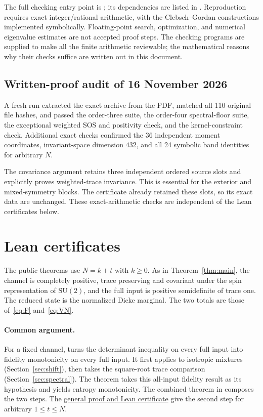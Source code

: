 \documentclass[11pt,a4paper]{article}
\begin{document}
The full checking entry point is ; its dependencies
are listed in . Reproduction requires exact
integer/rational arithmetic, with the Clebsch--Gordan constructions
implemented symbolically. Floating-point search, optimization, and
numerical eigenvalue estimates are not accepted proof steps. The
checking programs are supplied to make all the finite arithmetic
reviewable; the mathematical reasons why their checks suffice are
written out in this document.

\subsection{Written-proof audit of 16 November 2026}
A fresh run extracted the exact archive from the PDF, matched all 110
original file hashes, and passed the order-three suite, the order-four
spectral-floor suite, the exceptional weighted SOS and positivity check,
and the kernel-constraint check. Additional exact checks confirmed the
36 independent moment coordinates, invariant-space dimension $432$, and
all 24 symbolic band identities for arbitrary $N$.

The covariance argument retains three independent ordered
source slots and explicitly proves weighted-trace invariance. This is
essential for the exterior and mixed-symmetry blocks. The certificate
already retained these slots, so its exact data are unchanged.
These exact-arithmetic checks are independent of the Lean certificates below.

\clearpage\section{Lean certificates}\label{sec:lean}
The public theorems use $N=k+t$ with $k\ge0$. As in
Theorem~\ref{thm:main}, the channel is completely positive,
trace preserving and covariant under the spin representation of
$\mathrm{SU}(2)$, and the full input is positive semidefinite of trace one. The reduced state is the
normalized Dicke marginal. The two totals are those of~\eqref{eq:F}
and~\eqref{eq:VN}.

\paragraph{Common argument.}
For a fixed channel, 
turns the determinant inequality on every full input into fidelity
monotonicity on every full input. It first applies
 to isotropic mixtures
(Section~\ref{sec:shift}), then takes the square-root trace comparison
(Section~\ref{sec:spectral}). The theorem
 takes this all-input
fidelity result as its hypothesis and yields entropy monotonicity.
The combined theorem 
in  composes the two steps.
The \href{https://github.com/aenictusGitHub/mixed-spin-anticoherence/tree/main/fidelity-implies-entropy}{general proof and Lean certificate}
give the second step for arbitrary $1\le t\le N$.
\end{document}
